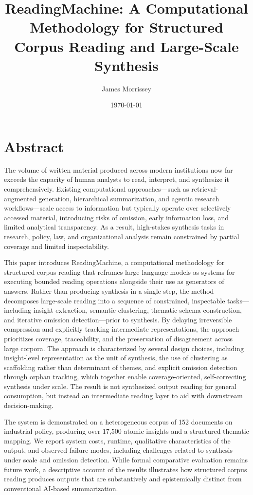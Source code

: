 \documentclass[
  11pt,
]{article}
\title{ReadingMachine: A Computational Methodology for Structured
Corpus Reading and Large-Scale Synthesis}
\author{James Morrissey}
\date{\today}
\begin{document}
\maketitle

\section*{Abstract}\label{abstract}

The volume of written material produced across modern institutions now 
far exceeds the capacity of human analysts to read, interpret, and synthesize it comprehensively. Existing computational approaches—such as 
retrieval-augmented generation, hierarchical summarization, and agentic research 
workflows—scale access to information but typically operate over selectively 
accessed material, introducing risks of omission, early information loss, and 
limited analytical transparency. As a result, high-stakes synthesis tasks in 
research, policy, law, and organizational analysis remain constrained by 
partial coverage and limited inspectability.

This paper introduces ReadingMachine, a computational methodology for 
structured corpus reading that reframes large language models as systems 
for executing bounded reading operations alongside their use as generators 
of answers. Rather than producing synthesis in a single step, the method 
decomposes large-scale reading into a sequence of constrained, inspectable 
tasks—including insight extraction, semantic clustering, thematic schema 
construction, and iterative omission detection—prior to synthesis. By delaying 
irreversible compression and explicitly tracking intermediate representations, 
the approach prioritizes coverage, traceability, and the preservation of 
disagreement across large corpora. The approach is characterized by several design 
choices, including insight-level representation as the unit of synthesis, the use 
of clustering as scaffolding rather than determinant of themes, and explicit 
omission detection through orphan tracking, which together enable coverage-oriented, 
self-correcting synthesis under scale. The result is not synthesized output reading 
for general consumption, but instead an intermediate reading layer to aid with 
downstream decision-making.

The system is demonstrated on a heterogeneous corpus of 152 documents on industrial 
policy, producing over 17,500 atomic insights and a structured thematic mapping. We 
report system costs, runtime, qualitative characteristics of the output, and observed 
failure modes, including challenges related to synthesis under scale and omission 
detection. While formal comparative evaluation remains future work, a descriptive 
account of the results illustrates how structured corpus reading produces outputs 
that are substantively and epistemically distinct from conventional AI-based summarization.
\end{document}
